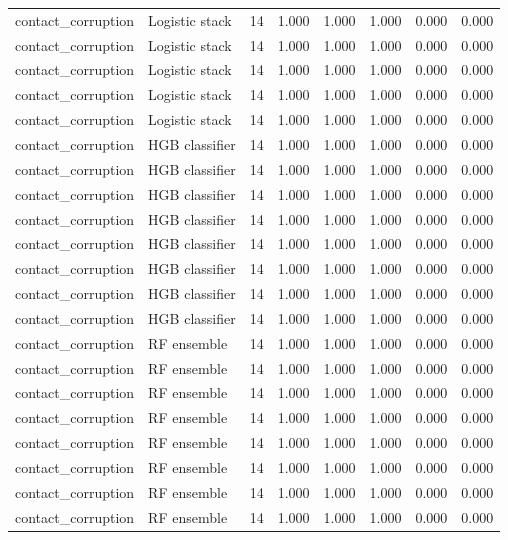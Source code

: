 {\begin{longtable}{llrrrrrr}
contact\_corruption & Logistic stack & 14 & 1.000 & 1.000 & 1.000 & 0.000 & 0.000 \\
contact\_corruption & Logistic stack & 14 & 1.000 & 1.000 & 1.000 & 0.000 & 0.000 \\
contact\_corruption & Logistic stack & 14 & 1.000 & 1.000 & 1.000 & 0.000 & 0.000 \\
contact\_corruption & Logistic stack & 14 & 1.000 & 1.000 & 1.000 & 0.000 & 0.000 \\
contact\_corruption & Logistic stack & 14 & 1.000 & 1.000 & 1.000 & 0.000 & 0.000 \\
contact\_corruption & HGB classifier & 14 & 1.000 & 1.000 & 1.000 & 0.000 & 0.000 \\
contact\_corruption & HGB classifier & 14 & 1.000 & 1.000 & 1.000 & 0.000 & 0.000 \\
contact\_corruption & HGB classifier & 14 & 1.000 & 1.000 & 1.000 & 0.000 & 0.000 \\
contact\_corruption & HGB classifier & 14 & 1.000 & 1.000 & 1.000 & 0.000 & 0.000 \\
contact\_corruption & HGB classifier & 14 & 1.000 & 1.000 & 1.000 & 0.000 & 0.000 \\
contact\_corruption & HGB classifier & 14 & 1.000 & 1.000 & 1.000 & 0.000 & 0.000 \\
contact\_corruption & HGB classifier & 14 & 1.000 & 1.000 & 1.000 & 0.000 & 0.000 \\
contact\_corruption & HGB classifier & 14 & 1.000 & 1.000 & 1.000 & 0.000 & 0.000 \\
contact\_corruption & RF ensemble & 14 & 1.000 & 1.000 & 1.000 & 0.000 & 0.000 \\
contact\_corruption & RF ensemble & 14 & 1.000 & 1.000 & 1.000 & 0.000 & 0.000 \\
contact\_corruption & RF ensemble & 14 & 1.000 & 1.000 & 1.000 & 0.000 & 0.000 \\
contact\_corruption & RF ensemble & 14 & 1.000 & 1.000 & 1.000 & 0.000 & 0.000 \\
contact\_corruption & RF ensemble & 14 & 1.000 & 1.000 & 1.000 & 0.000 & 0.000 \\
contact\_corruption & RF ensemble & 14 & 1.000 & 1.000 & 1.000 & 0.000 & 0.000 \\
contact\_corruption & RF ensemble & 14 & 1.000 & 1.000 & 1.000 & 0.000 & 0.000 \\
contact\_corruption & RF ensemble & 14 & 1.000 & 1.000 & 1.000 & 0.000 & 0.000 \\

\end{longtable}}

